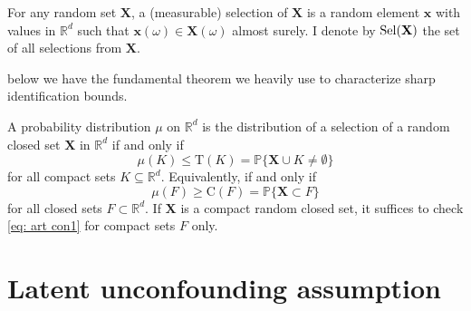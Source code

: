 \documentclass[uplatex,dvipdfmx]{jsarticle}
\begin{document}
\begin{definition} 
    For any random set $\mathbf{X}$, a (measurable) selection of $\mathbf{X}$ is a random element $\mathbf{x}$ with values in $\mathbb{R}^d$ such that $\mathbf{x}(\omega) \in \mathbf{X}( \omega)$ almost surely. I denote by $\mathrm{Sel}( \mathbf{X} )$ the set of all selections from $\mathbf{X}$.
\end{definition}

below we have the fundamental theorem we heavily use to characterize sharp identification bounds. 
\begin{theorem}\label{eq:artgen}
    A probability distribution $\mu$ on $ \mathbb{R}^d$ is the distribution of a selection of a random closed set $\mathbf{X}$ in $\mathbb{R}^d$ if and only if
    \begin{equation}
        \mu(K) \leq \mathrm{T}(K) = \mathbb{P} \{ \mathbf{X} \cup K \neq \emptyset \}
    \end{equation}
    for all compact sets $K \subseteq \mathbb{R}^d $. Equivalently, if and only if
    \begin{equation}
    \label{eq: art con1}
        \mu(F) \geq \mathrm{C}(F) = \mathbb{P} \{ \mathbf{X} \subset F \}
    \end{equation}
    for all closed sets $ F \subset \mathbb{R}^d $. If $ \mathbf{X} $ is a compact random closed set, it suffices to check \ref{eq: art con1} for compact sets $F$ only.
\end{theorem}

\section{Latent unconfounding assumption}
\end{document}
